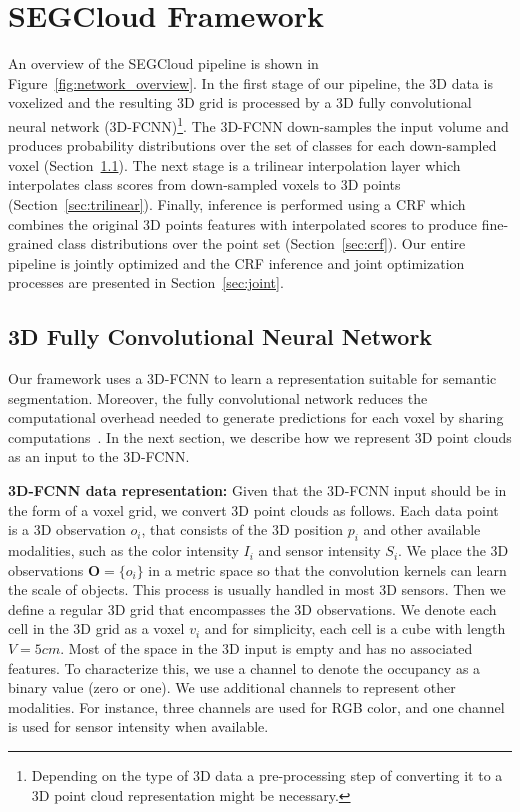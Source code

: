 \documentclass[10pt,twocolumn,letterpaper]{article}
\newcommand{\fccrf}[0]{CRF\xspace}
\newcommand{\ours}[0]{SEGCloud\xspace}
\newcommand{\threedfcnn}[0]{3D-FCNN\xspace}
\begin{document}
\section{\ours Framework} \label{sec:framework}
An overview of the \ours pipeline is shown in Figure~\ref{fig:network_overview}. In the first stage of our pipeline, the 3D data is voxelized and the resulting 3D grid is processed by a 3D fully convolutional neural network (\threedfcnn)\footnote{Depending on the type of 3D data a pre-processing step of converting it to a 3D point cloud representation might be necessary.}. The \threedfcnn down-samples the input volume and produces probability distributions over the set of classes for each down-sampled voxel (Section~\ref{sec:threedcnn}). The next stage is a trilinear interpolation layer which interpolates class scores from down-sampled voxels to 3D points (Section~\ref{sec:trilinear}). Finally, inference is performed using a \fccrf which combines the original 3D points features with interpolated scores to produce fine-grained class distributions over the point set (Section~\ref{sec:crf}). Our entire pipeline is jointly optimized and the \fccrf inference and joint optimization processes are presented in Section~\ref{sec:joint}.


\subsection{3D Fully Convolutional Neural Network} \label{sec:threedcnn}

Our framework uses a \threedfcnn to learn a representation suitable for semantic segmentation. Moreover, the fully convolutional network reduces the computational overhead needed to generate predictions for each voxel by sharing computations~\cite{Long2015}. In the next section, we describe how we represent 3D point clouds as an input to the \threedfcnn.

\noindent\textbf{\threedfcnn data representation: }Given that the  \threedfcnn input should be in the form of a voxel grid, we convert 3D point clouds as follows. Each data point is a 3D observation $o_i$, that consists of the 3D position $p_i$ and other available modalities, such as the color intensity $I_i$ and sensor intensity $S_i$. We place the 3D observations $\mathbf{O}=\{o_i\}$ in a metric space so that the convolution kernels can learn the scale of objects. This process is usually handled in most 3D sensors. Then we define a regular 3D grid that encompasses the 3D observations. We denote each cell in the 3D grid as a voxel $v_i$ and for simplicity, each cell is a cube with length $V = 5cm$. Most of the space in the 3D input is empty and has no associated features. To characterize this, we use a channel to denote the occupancy as a binary value (zero or one). We use additional channels to represent other modalities. For instance, three channels are used for RGB color, and one channel is used for sensor intensity when available.
\end{document}
